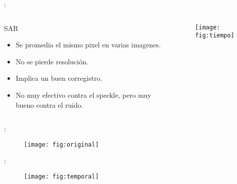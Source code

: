 \begin{frame}{\secname : \subsecname}
  \begin{columns}[t]
    \begin{column}{0.5\textwidth}
     \begin{block}{SAR}
       \begin{itemize}
         \item Se promedia el mismo pixel en varias imagenes.
         \item No se pierde resolución.
         \item Implica un buen corregistro.
         \item No muy efectivo contra el speckle, pero muy bueno contra el ruido.
       \end{itemize}
     \end{block}
    \end{column}
    \begin{column}{0.5\textwidth}  %
        \begin{figure}
          \centering
          \texttt{[image: fig:tiempo]}
          \caption{}
          \label{}
        \end{figure}
    \end{column}
    \end{columns}
\end{frame}

\begin{frame}{\secname : \subsecname}
  \begin{figure}
    \centering
    \texttt{[image: fig:original]}
    \caption{ }
    \label{}
  \end{figure}
\end{frame}

\begin{frame}{\secname : \subsecname}
  \begin{figure}
    \centering
    \texttt{[image: fig:temporal]}
    \caption{ }
    \label{}
  \end{figure}
\end{frame}

